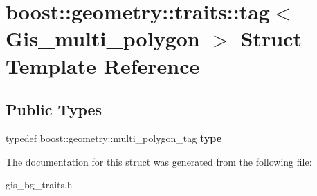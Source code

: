 \hypertarget{structboost_1_1geometry_1_1traits_1_1tag_3_01Gis__multi__polygon_01_4}{}\section{boost\+:\+:geometry\+:\+:traits\+:\+:tag$<$ Gis\+\_\+multi\+\_\+polygon $>$ Struct Template Reference}
\label{structboost_1_1geometry_1_1traits_1_1tag_3_01Gis__multi__polygon_01_4}
\subsection*{Public Types}
\begin{DoxyCompactItemize}
\item 
\mbox{\label{structboost_1_1geometry_1_1traits_1_1tag_3_01Gis__multi__polygon_01_4_ab47f68ce6d42969b50f99717e182ca01}} 
typedef boost\+::geometry\+::multi\+\_\+polygon\+\_\+tag {\bfseries type}
\end{DoxyCompactItemize}


The documentation for this struct was generated from the following file\+:\begin{DoxyCompactItemize}
\item 
gis\+\_\+bg\+\_\+traits.\+h\end{DoxyCompactItemize}
